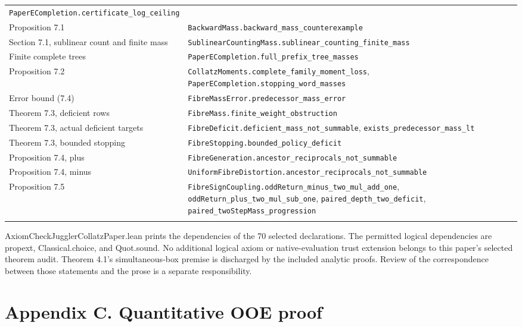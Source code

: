 \documentclass[11pt,a4paper]{article}
\begin{document}
\begin{longtable}[]{@{}
  >{\raggedright\arraybackslash}p{}
  >{\raggedright\arraybackslash}p{}@{}}
\texttt{\nolinkurl{PaperECompletion.certificate_log_ceiling}} \\
Proposition 7.1 &
\texttt{\nolinkurl{BackwardMass.backward_mass_counterexample}} \\
Section 7.1, sublinear count and finite mass &
\texttt{\nolinkurl{SublinearCountingMass.sublinear_counting_finite_mass}} \\
Finite complete trees &
\texttt{\nolinkurl{PaperECompletion.full_prefix_tree_masses}} \\
Proposition 7.2 &
\texttt{\nolinkurl{CollatzMoments.complete_family_moment_loss}},
\texttt{\nolinkurl{PaperECompletion.stopping_word_masses}} \\
Error bound (7.4) &
\texttt{\nolinkurl{FibreMassError.predecessor_mass_error}} \\
Theorem 7.3, deficient rows &
\texttt{\nolinkurl{FibreMass.finite_weight_obstruction}} \\
Theorem 7.3, actual deficient targets &
\texttt{\nolinkurl{FibreDeficit.deficient_mass_not_summable}},
\texttt{\nolinkurl{exists_predecessor_mass_lt}} \\
Theorem 7.3, bounded stopping &
\texttt{\nolinkurl{FibreStopping.bounded_policy_deficit}} \\
Proposition 7.4, plus &
\texttt{\nolinkurl{FibreGeneration.ancestor_reciprocals_not_summable}} \\
Proposition 7.4, minus &
\texttt{\nolinkurl{UniformFibreDistortion.ancestor_reciprocals_not_summable}} \\
Proposition 7.5 &
\texttt{\nolinkurl{FibreSignCoupling.oddReturn_minus_two_mul_add_one}},
\texttt{\nolinkurl{oddReturn_plus_two_mul_sub_one}},
\texttt{\nolinkurl{paired_depth_two_deficit}},
\texttt{\nolinkurl{paired_twoStepMass_progression}} \\*
\end{longtable}

\endgroup

AxiomCheckJugglerCollatzPaper.lean prints the dependencies of the 70
selected declarations. The permitted logical dependencies are propext,
Classical.choice, and Quot.sound. No additional logical axiom or
native-evaluation trust extension belongs to this paper's selected
theorem audit. Theorem 4.1's simultaneous-box premise is discharged by
the included analytic proofs. Review of the correspondence between those
statements and the prose is a separate responsibility.

\section{Appendix C. Quantitative OOE
proof}\label{appendix-c.-quantitative-ooe-proof}
\end{document}
